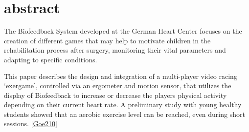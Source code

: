 \section{abstract}
The Biofeedback System developed at the German Heart Center focuses on the creation of different games that may help to motivate children in the rehabilitation process after surgery, monitoring their vital parameters and adapting to specific conditions.

This paper describes the design and integration of a multi-player video racing ‘exergame’,  controlled via an ergometer and motion sensor, that utilizes the display of Biofeedback to increase or decrease the players physical activity depending on their current heart rate. A preliminary study with young healthy students showed that an aerobic exercise level can be reached, even during short sessions.
\cref{Goe210}
